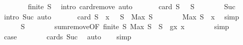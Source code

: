 \begin{isabellebody}
\ \ \ \ \ \ \isamarkupfalse%
\ {\isacharbackquoteopen}finite\ S{\isacharbackquoteclose}\ \isamarkupfalse%
\ {\isacharparenleft}{\kern0pt}intro\ card{\isachardot}{\kern0pt}remove{\isacharsemicolon}{\kern0pt}\ auto{\isacharparenright}{\kern0pt}\isanewline
\ \ \ \ \isamarkupfalse%
\ {\isachardoublequoteopen}{\isasymSum}\ {\isacharbraceleft}{\kern0pt}{}{\isachardot}{\kern0pt}{\isachardot}{\kern0pt}{\isacharless}{\kern0pt}card\ {\isacharquery}{\kern0pt}S{\isacharprime}{\kern0pt}{\isacharbraceright}{\kern0pt}\ {\isasymle}\ {\isasymSum}\ {\isacharquery}{\kern0pt}S{\isacharprime}{\kern0pt}{\isachardoublequoteclose}\isanewline
\ \ \ \ \ \ \isamarkupfalse%
\ Suc\ \isamarkupfalse%
\ {\isacharparenleft}{\kern0pt}intro\ Suc{\isacharsemicolon}{\kern0pt}\ auto{\isacharparenright}{\kern0pt}\isanewline
\isanewline
\ \ \ \ \isamarkupfalse%
\ {\isachardoublequoteopen}{\isasymSum}\ {\isacharbraceleft}{\kern0pt}{}{\isachardot}{\kern0pt}{\isachardot}{\kern0pt}{\isacharless}{\kern0pt}card\ {\isacharquery}{\kern0pt}S{\isacharprime}{\kern0pt}{\isacharbraceright}{\kern0pt}\ {\isacharplus}{\kern0pt}\ x\ {\isasymle}\ {\isasymSum}\ {\isacharquery}{\kern0pt}S{\isacharprime}{\kern0pt}\ {\isacharplus}{\kern0pt}\ Max\ S{\isachardoublequoteclose}\isanewline
\ \ \ \ \ \ \isamarkupfalse%
\ {\isacharbackquoteopen}Max\ S\ {\isasymge}\ x{\isacharbackquoteclose}\ \isamarkupfalse%
\ simp\isanewline
\ \ \ \ \isamarkupfalse%
\ \isamarkupfalse%
\ {\isachardoublequoteopen}{\isachardot}{\kern0pt}{\isachardot}{\kern0pt}{\isachardot}{\kern0pt}\ {\isacharequal}{\kern0pt}\ {\isasymSum}\ S{\isachardoublequoteclose}\isanewline
\ \ \ \ \ \ \isamarkupfalse%
\ sum{\isachardot}{\kern0pt}remove{\isacharbrackleft}{\kern0pt}OF\ {\isacharbackquoteopen}finite\ S{\isacharbackquoteclose}\ {\isacharbackquoteopen}Max\ S\ {\isasymin}\ S{\isacharbackquoteclose}{\isacharcomma}{\kern0pt}\ \ g{\isacharequal}{\kern0pt}{\isachardoublequoteopen}{\isasymlambda}x{\isachardot}{\kern0pt}\ x{\isachardoublequoteclose}{\isacharbrackright}{\kern0pt}\isanewline
\ \ \ \ \ \ \isamarkupfalse%
\ simp\isanewline
\ \ \ \ \isamarkupfalse%
\ \isamarkupfalse%
\ {\isacharquery}{\kern0pt}case\isanewline
\ \ \ \ \ \ \isamarkupfalse%
\ cards\ Suc\ \isamarkupfalse%
\ auto\isanewline
\ \ \isamarkupfalse%
\ simp\isanewline
{}\isamarkupfalse%

\end{isabellebody}
